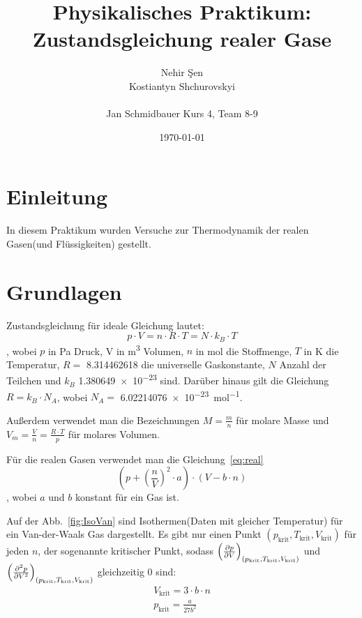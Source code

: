 \documentclass[11pt,a4paper]{article}
\begin{document}
\title{Physikalisches Praktikum: Zustandsgleichung realer Gase}
\author{Nehir Şen  \\
        Kostiantyn Shchurovskyi \\ \\
        Jan Schmidbauer
        Kurs 4, Team 8-9}
\date{\today}
\maketitle

\tableofcontents


\clearpage

\section{Einleitung}
In diesem Praktikum wurden Versuche zur Thermodynamik der realen Gasen(und Flüssigkeiten) gestellt.
\section{Grundlagen}
Zustandsgleichung für ideale Gleichung lautet:
\begin{equation}
    p\cdot V = n\cdot R\cdot T = N\cdot k_B\cdot T \label{eq:ideal}
\end{equation}, wobei $p$ in \unit{Pa} Druck, V in \unit{m^3} Volumen, $n$ in \unit{mol} die Stoffmenge, $T$ in \unit{K} die Temperatur, $R =$ \qty{8,314462618}{} die universelle Gaskonstante, $N$ Anzahl der Teilchen und $k_B$ \qty{1,380649e-23}{} sind. Darüber hinaus gilt die Gleichung $R = k_B \cdot N_A$, wobei $N_A =$ \qty{6,02214076e-23}{\mol^{-1}}.

Außerdem verwendet man die Bezeichnungen $M = \frac{m}{n}$ für molare Masse und $V_m = \frac{V}{n} = \frac{R\cdot T}{p}$ für molares Volumen.

Für die realen Gasen verwendet man die Gleichung~\eqref{eq:real}
\begin{equation}
    \left(p + \left(\frac{n}{V}\right)^2\cdot a\right)\cdot\left(V - b\cdot n\right) \label{eq:real}
\end{equation}, wobei $a$ und $b$ konstant für ein Gas ist.

Auf der Abb.~\ref{fig:IsoVan} sind Isothermen(Daten mit gleicher Temperatur) für ein Van-der-Waals Gas dargestellt. Es gibt nur einen Punkt $(p_\text{krit}, T_\text{krit}, V_\text{krit})$ für jeden $n$, der sogenannte kritischer Punkt, sodass $\left(\pdv{p}{V}\right)_{(p_\text{krit}, T_\text{krit}, V_\text{krit})}$ und $\left(\pdv[2]{p}{V}\right)_{(p_\text{krit}, T_\text{krit}, V_\text{krit})}$ gleichzeitig $0$ sind:
\begin{gather}
    V_\text{krit} = 3\cdot b\cdot n \label{eq:Vkrit} \\
    p_\text{krit} = \frac{a}{27b^2} \label{eq:pkrit}
\end{gather}
\end{document}

